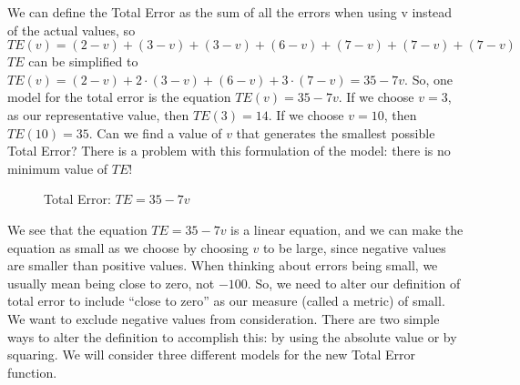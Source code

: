 \documentclass[10pt,]{book}
\theoremstyle{ptxdefinitionnotitle}
\theoremstyle{ptxdefinitiontitle}
\numberwithin{equation}{section}
\begin{document}
\begin{example}[{.}]
\par
\hypertarget{p-47}{}%
We can define the Total Error as the sum of all the errors when using v instead of the actual values, so%
\begin{equation*}
TE\left( v \right) = \left( {2 - v} \right) + \left( {3 - v} \right) + \left( {3 - v} \right) + \left( {6 - v} \right) + \left( {7 - v} \right) + \left( {7 - v} \right) + \left( {7 - v} \right)
\end{equation*}
\(TE\) can be simplified to \(TE\left( v \right) = \left( {2 - v} \right) + 2 \cdot \left( {3 - v} \right) + \left( {6 - v} \right) + 3 \cdot \left( {7 - v} \right) = 35 - 7v\). So, one model for the total error is the equation \(TE\left( v \right) = 35 - 7v\). If we choose \(v = 3\), as our representative value, then \(TE\left( 3 \right) = 14\). If we choose \(v = 10\), then \(TE\left( 10 \right) = 35\). Can we find a value of \(v\) that generates the smallest possible Total Error? There is a problem with this formulation of the model: there is no minimum value of \(TE\)! \\%
\begin{figure}
\centering
{
}
\caption{Total Error: \(TE = 35 - 7v\)\label{total-error-no-minimum}}
\end{figure}
\hypertarget{p-48}{}%
We see that the equation \(TE = 35 - 7v\) is a linear equation, and we can make the equation as small as we choose by choosing \(v\) to be large, since negative values are smaller than positive values. When thinking about errors being small, we usually mean being close to zero, not \(- 100\). So, we need to alter our definition of total error to include ``close to zero'' as our measure (called a metric) of small. We want to exclude negative values from consideration. There are two simple ways to alter the definition to accomplish this: by using the absolute value or by squaring. We will consider three different models for the new Total Error function.%
\par
\hypertarget{p-49}{}%
%
\begin{equation*}

\end{equation*}
\end{example}
\end{document}
